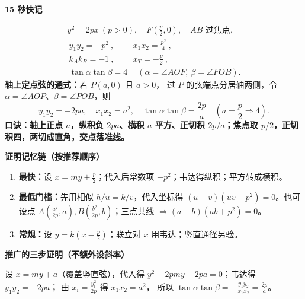 \clearpage
\begin{summarybox}
\textbf{\textcolor{CSummary}{15 秒快记}}\par\smallskip
\[
 \begin{gathered}
 y^2=2px\ (p>0),\quad F\!\left(\frac p2,0\right),\quad AB\text{ 过焦点},\\[3pt]
 \boxed{\ y_1y_2=-p^2\ },\qquad
 \boxed{\ x_1x_2=\frac{p^2}{4}\ },\\[3pt]
 \boxed{\ k_Ak_B=-1\ },\qquad
 \boxed{\ x_T=-\frac p2\ },\\[3pt]
 \boxed{\ \tan\alpha\tan\beta=4\ }
 \quad(\alpha=\angle AOF,\ \beta=\angle FOB).
 \end{gathered}
\]
\textbf{轴上定点弦的通式：}若 $P(a,0)$ 且 $a>0$，
过 $P$ 的弦端点分居轴两侧，令 $\alpha=\angle AOP$、$\beta=\angle POB$，则
\[
 \boxed{y_1y_2=-2pa},\quad
 \boxed{x_1x_2=a^2},\quad
 \boxed{\tan\alpha\tan\beta=\frac{2p}{a}}
 \quad\left(a=\frac p2\Rightarrow4\right).
\]
\textbf{口诀：}\quad \textbf{轴上正点 $a$，纵积负 $2pa$、横积 $a$ 平方、正切积 $2p/a$；焦点取 $p/2$，正切积四，两切成直角，交点落准线。}

\medskip
\textbf{\textcolor{CSummary}{证明记忆链（按推荐顺序）}}\par\smallskip
\begin{enumerate}[leftmargin=*,itemsep=0.3em]
 \item \textbf{最快：}设 $x=my+\frac p2$；代入后常数项 $-p^2$；韦达得纵积；平方转成横积。
 \item \textbf{最低门槛：}先用相似 $h/u=k/v$，代入坐标得 $(u+v)(uv-p^2)=0$。也可设点 $A(\frac{a^2}{2p},a),B(\frac{b^2}{2p},b)$；三点共线 $\Rightarrow(a-b)(ab+p^2)=0$。
 \item \textbf{常规：}设 $y=k(x-\frac p2)$；联立对 $x$ 用韦达；竖直通径另验。
\end{enumerate}

\medskip
\textbf{\textcolor{CSummary}{推广的三步证明（不额外设斜率）}}\par\smallskip
设 $x=my+a$（覆盖竖直弦），代入得
$y^2-2pmy-2pa=0$；韦达得 $y_1y_2=-2pa$；
由 $x_i=\frac{y_i^2}{2p}$ 得 $x_1x_2=a^2$，
所以 $\tan\alpha\tan\beta=-\frac{y_1y_2}{x_1x_2}=\frac{2p}{a}$。

\end{summarybox}
\clearpage
